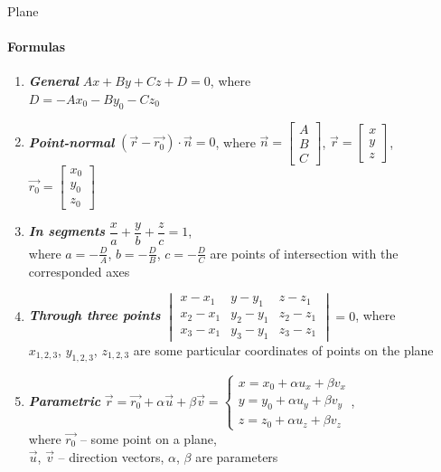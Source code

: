 \documentclass[aspectratio=169]{beamer}
\begin{document}
\begin{frame}[t]{Plane}
    \framesubtitle{Formulas}
    \scriptsize
    \vspace{-0.4cm}
    \begin{multicols}{2}
        \begin{enumerate}
            \item \textbf{\textit{General}} $Ax + By + Cz + D = 0$, where \\ $D = -Ax_0 - By_0 - Cz_0$
            \item \textbf{\textit{Point-normal}} $(\vec{r} - \vec{r_0}) \cdot \vec{n} = 0$, where $\vec{n} = \begin{bmatrix}A\\B\\C \end{bmatrix}$, $\vec{r} = \begin{bmatrix}x\\y\\z \end{bmatrix}$, $\vec{r_0} = \begin{bmatrix}x_0\\y_0\\z_0 \end{bmatrix}$
            \item \textbf{\textit{In segments}} $\dfrac{x}{a} + \dfrac{y}{b} + \dfrac{z}{c} = 1$,\\ where $a=-\frac{D}{A}$, $b=-\frac{D}{B}$, $c=-\frac{D}{C}$ are points of intersection with the corresponded axes
            \item \textbf{\textit{Through three points}} $\begin{vmatrix}
                          x-x_1   & y-y_1   & z-z_1   \\
                          x_2-x_1 & y_2-y_1 & z_2-z_1 \\
                          x_3-x_1 & y_3-y_1 & z_3-z_1
                      \end{vmatrix} = 0 $, where \\ $x_{1,2,3}$, $y_{1,2,3}$, $z_{1,2,3}$ are some particular coordinates of points on the plane
            \item \textbf{\textit{Parametric}} $\vec{r} = \vec{r_0} + \alpha \vec{u} + \beta \vec{v} = \left\{\begin{matrix} x = x_0 + \alpha u_x + \beta v_x
                          \\ y = y_0 + \alpha u_y + \beta v_y \\ z = z_0 + \alpha u_z + \beta v_z
                      \end{matrix}\right. $, \\where $\vec{r_0}$ -- some point on a plane,\\ $\vec{u}$, $\vec{v}$ -- direction vectors, $\alpha$, $\beta$ are parameters
        \end{enumerate}
    \end{multicols}
\end{frame}
\end{document}
